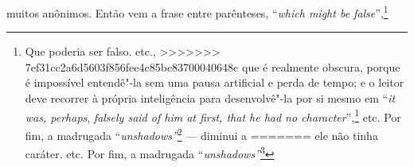 {{{{{{{{{{{{{{{{{{{{{{{{{{{{{{{{{{{{{{{{{{{{{{{{{muitos anônimos. Então vem a frase entre parênteses, ``\textit{which might
be false}'',\footnote{Que poderia ser falso.  etc.,
>>>>>>> 7ef31cc2a6d5603f856fee4c85bc83700040648c
que é realmente obscura, porque é impossível entendê"-la sem uma pausa
artificial e perda de tempo; e o leitor deve recorrer à própria
inteligência para desenvolvê"-la por si mesmo em ``\textit{it was,
perhaps}, \textit{falsely said of him at first, that he had no
character}'',\footnote{Foi, talvez, falsamente dito, inicialmente, que
<<<<<<< HEAD
  ele não tinha caráter.} etc. Por fim, a madrugada
``\textit{unshadows''}\footnote{Desensombra.} --- diminui a
=======
  ele não tinha caráter.  etc. Por fim, a madrugada
``\textit{unshadows''}\footnote{Desensombra.  --- diminui a
>>>>>>> 7ef31cc2a6d5603f856fee4c85bc83700040648c
sombra sobre o Rialto, --- mas não o ilumina como às águas da laguna.

A seguir, considere as duas frases sobre poesia, contidas nas
cartas a Murray, de 15 de setembro de 1817 e 12 de abril de 1818; (para
avaliar a força dessas afirmações, compare"-as com as declarações
publicadas, em resposta a Blackwood, em 1820).

}}}}}}}}}}}}}}}}}}}}}}}}}}}}}}}}}}}}}}}}}}}}}}}}}}}
